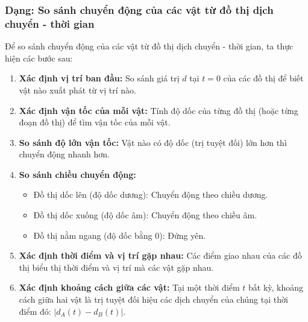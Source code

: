 \subsubsection{Dạng: So sánh chuyển động của các vật từ đồ thị dịch chuyển - thời gian}
\begin{phuongphap}
Để so sánh chuyển động của các vật từ đồ thị dịch chuyển - thời gian, ta thực hiện các bước sau:
\begin{enumerate}
    \item \textbf{Xác định vị trí ban đầu:} So sánh giá trị $d$ tại $t=0$ của các đồ thị để biết vật nào xuất phát từ vị trí nào.
    \item \textbf{Xác định vận tốc của mỗi vật:} Tính độ dốc của từng đồ thị (hoặc từng đoạn đồ thị) để tìm vận tốc của mỗi vật.
    \item \textbf{So sánh độ lớn vận tốc:} Vật nào có độ dốc (trị tuyệt đối) lớn hơn thì chuyển động nhanh hơn.
    \item \textbf{So sánh chiều chuyển động:}
    \begin{itemize}
        \item Đồ thị dốc lên (độ dốc dương): Chuyển động theo chiều dương.
        \item Đồ thị dốc xuống (độ dốc âm): Chuyển động theo chiều âm.
        \item Đồ thị nằm ngang (độ dốc bằng 0): Đứng yên.
    \end{itemize}
    \item \textbf{Xác định thời điểm và vị trí gặp nhau:} Các điểm giao nhau của các đồ thị biểu thị thời điểm và vị trí mà các vật gặp nhau.
    \item \textbf{Xác định khoảng cách giữa các vật:} Tại một thời điểm $t$ bất kỳ, khoảng cách giữa hai vật là trị tuyệt đối hiệu các dịch chuyển của chúng tại thời điểm đó: $|d_A(t) - d_B(t)|$.
\end{enumerate}
\end{phuongphap}

